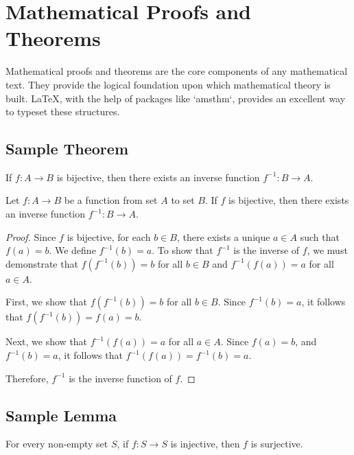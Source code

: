 \section{Mathematical Proofs and Theorems}

Mathematical proofs and theorems are the core components of any mathematical text. They provide the logical foundation upon which mathematical theory is built. LaTeX, with the help of packages like `amsthm`, provides an excellent way to typeset these structures.

\subsection{Sample Theorem}
\begin{mdframed}
\begin{theorem}
    If \( f: A \to B \) is bijective, then there exists an inverse function \( f^{-1}: B \to A \).
\end{theorem}
\end{mdframed}

\begin{theorem}
Let \( f: A \to B \) be a function from set \( A \) to set \( B \). If \( f \) is bijective, then there exists an inverse function \( f^{-1}: B \to A \).
\end{theorem}

\begin{proof}
Since \( f \) is bijective, for each \( b \in B \), there exists a unique \( a \in A \) such that \( f(a) = b \). We define \( f^{-1}(b) = a \). To show that \( f^{-1} \) is the inverse of \( f \), we must demonstrate that \( f(f^{-1}(b)) = b \) for all \( b \in B \) and \( f^{-1}(f(a)) = a \) for all \( a \in A \).

First, we show that \( f(f^{-1}(b)) = b \) for all \( b \in B \). Since \( f^{-1}(b) = a \), it follows that \( f(f^{-1}(b)) = f(a) = b \).

Next, we show that \( f^{-1}(f(a)) = a \) for all \( a \in A \). Since \( f(a) = b \), and \( f^{-1}(b) = a \), it follows that \( f^{-1}(f(a)) = f^{-1}(b) = a \).

Therefore, \( f^{-1} \) is the inverse function of \( f \).
\end{proof}

\subsection{Sample Lemma}
\begin{lemma}
For every non-empty set \( S \), if \( f: S \to S \) is injective, then \( f \) is surjective.
\end{lemma}

